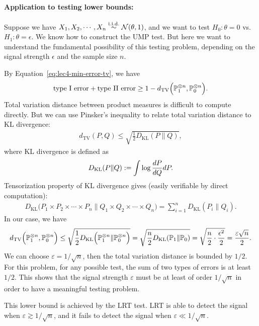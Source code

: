 \documentclass[11pt,letterpaper]{article}
\numberwithin{theorem}{lecture}
\numberwithin{proposition}{lecture}
\numberwithin{lemma}{lecture}
\numberwithin{claim}{lecture}
\numberwithin{corollary}{lecture}
\numberwithin{definition}{lecture}
\numberwithin{conjecture}{lecture}
\numberwithin{remark}{lecture}
\numberwithin{example}{lecture}
\numberwithin{equation}{lecture}
\begin{document}
\paragraph{Application to testing lower bounds:} Suppose we have $X_1, X_2, \cdots, X_n \overset{\mathrm{i.i.d.}}{\sim} \mathcal{N} (\theta, 1)$, and we want to test $H_0: \theta = 0$ vs. $H_1: \theta = \epsilon$. We know how to construct the UMP test. But here we want to understand the fundamental possibility of this testing problem, depending on the signal strength $\epsilon$ and the sample size $n$.

By Equation~\eqref{eq:lec4-min-error-tv}, we have
\begin{align*}
\text{type I error} + \text{type II error} \geq 1 - d_{\mathrm{TV}} \Big( {\mathbb{P}}_1^{\otimes n}, {\mathbb{P}}_0^{\otimes n} \Big).
\end{align*}
Total variation distance between product measures is difficult to compute directly. But we can use Pinsker's inequality to relate total variation distance to KL divergence:
\begin{align*}
  d_{\mathrm{TV}} (P, Q) \leq \sqrt{\frac{1}{2} D_{\mathrm{KL}} (P \| Q)},
\end{align*}
where KL divergence is defined as
\begin{align*}
    D_{\mathrm{KL}} (P \| Q) := \int \log \frac{dP}{dQ} dP.
  \end{align*}
  Tensorization property of KL divergence gives (easily verifiable by direct computation):
  \begin{align*}
    D_{\mathrm{KL}} \big( P_1 \times P_2 \times \cdots \times P_n \|  Q_1 \times Q_2 \times \cdots \times Q_n \big) = \sum_{i=1}^n D_{\mathrm{KL}} (P_i \| Q_i).
  \end{align*}
  In our case, we have
  \begin{align*}
  d_{\mathrm{TV}} \Big( {\mathbb{P}}_1^{\otimes n}, {\mathbb{P}}_0^{\otimes n} \Big) \leq \sqrt{\frac{1}{2} D_{\mathrm{KL}} \Big( {\mathbb{P}}_1^{\otimes n} \| {\mathbb{P}}_0^{\otimes n} \Big)} = \sqrt{\frac{n}{2} D_{\mathrm{KL}} ({\mathbb{P}}_1 \| {\mathbb{P}}_0)} = \sqrt{\frac{n}{2} \cdot \frac{\epsilon^2}{2}} = \frac{\varepsilon\sqrt{n}}{2}.
  \end{align*}
We can choose $\varepsilon = 1 / \sqrt{n}$, then the total variation distance is bounded by $1/2$. For this problem, for any possible test, the sum of two types of errors is at least $1/2$. This shows that the signal strength $\varepsilon$ must be at least of order $1/\sqrt{n}$ in order to have a meaningful testing problem.

This lower bound is achieved by the LRT test. LRT is able to detect the signal when $\varepsilon \gtrsim 1/\sqrt{n}$, and it fails to detect the signal when $\varepsilon \ll 1/\sqrt{n}$.
\end{document}
